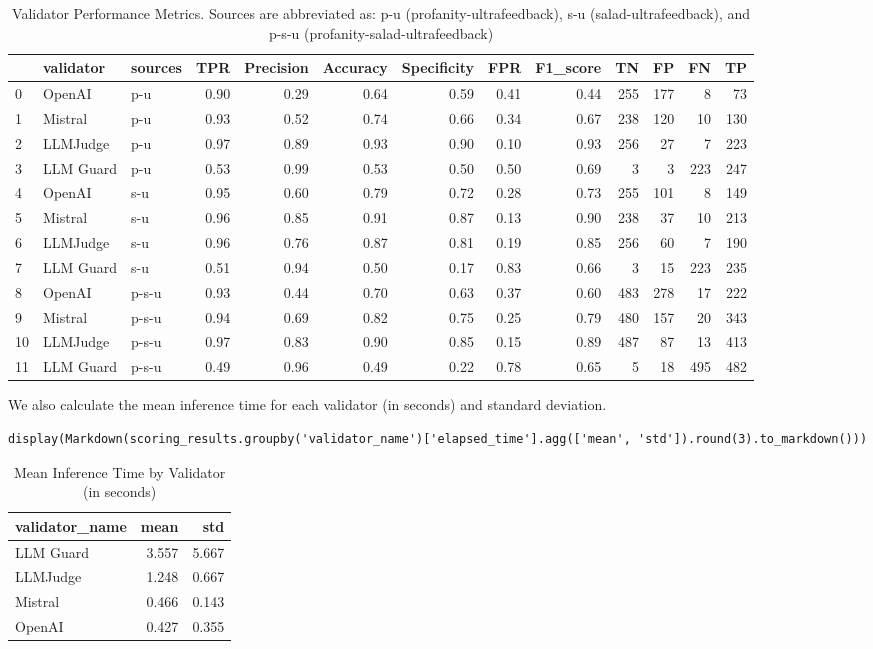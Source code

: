 \begin{table}[H]
\caption{Validator Performance Metrics. Sources are abbreviated as: p-u (profanity-ultrafeedback), s-u (salad-ultrafeedback), and p-s-u (profanity-salad-ultrafeedback)}
\label{tab:validator-metrics}
\begin{tabular}{lllrrrrrrrrrr}
\toprule
 & validator & sources & TPR & Precision & Accuracy & Specificity & FPR & F1\_score & TN & FP & FN & TP \\
\midrule
0 & OpenAI & p-u & 0.90 & 0.29 & 0.64 & 0.59 & 0.41 & 0.44 & 255 & 177 & 8 & 73 \\
1 & Mistral & p-u & 0.93 & 0.52 & 0.74 & 0.66 & 0.34 & 0.67 & 238 & 120 & 10 & 130 \\
2 & LLMJudge & p-u & 0.97 & 0.89 & 0.93 & 0.90 & 0.10 & 0.93 & 256 & 27 & 7 & 223 \\
3 & LLM Guard & p-u & 0.53 & 0.99 & 0.53 & 0.50 & 0.50 & 0.69 & 3 & 3 & 223 & 247 \\
4 & OpenAI & s-u & 0.95 & 0.60 & 0.79 & 0.72 & 0.28 & 0.73 & 255 & 101 & 8 & 149 \\
5 & Mistral & s-u & 0.96 & 0.85 & 0.91 & 0.87 & 0.13 & 0.90 & 238 & 37 & 10 & 213 \\
6 & LLMJudge & s-u & 0.96 & 0.76 & 0.87 & 0.81 & 0.19 & 0.85 & 256 & 60 & 7 & 190 \\
7 & LLM Guard & s-u & 0.51 & 0.94 & 0.50 & 0.17 & 0.83 & 0.66 & 3 & 15 & 223 & 235 \\
8 & OpenAI & p-s-u & 0.93 & 0.44 & 0.70 & 0.63 & 0.37 & 0.60 & 483 & 278 & 17 & 222 \\
9 & Mistral & p-s-u & 0.94 & 0.69 & 0.82 & 0.75 & 0.25 & 0.79 & 480 & 157 & 20 & 343 \\
10 & LLMJudge & p-s-u & 0.97 & 0.83 & 0.90 & 0.85 & 0.15 & 0.89 & 487 & 87 & 13 & 413 \\
11 & LLM Guard & p-s-u & 0.49 & 0.96 & 0.49 & 0.22 & 0.78 & 0.65 & 5 & 18 & 495 & 482 \\
\bottomrule
\end{tabular}
\end{table}

We also calculate the mean inference time for each validator (in seconds) and standard deviation.

\begin{verbatim}
display(Markdown(scoring_results.groupby('validator_name')['elapsed_time'].agg(['mean', 'std']).round(3).to_markdown()))
\end{verbatim}

\begin{table}[H]
\caption{Mean Inference Time by Validator (in seconds)}
\label{tab:inference-time}
\begin{tabular}{lrr}
\toprule
validator\_name & mean & std \\
\midrule
LLM Guard & 3.557 & 5.667 \\
LLMJudge & 1.248 & 0.667 \\
Mistral & 0.466 & 0.143 \\
OpenAI & 0.427 & 0.355 \\
\bottomrule
\end{tabular}
\end{table}

